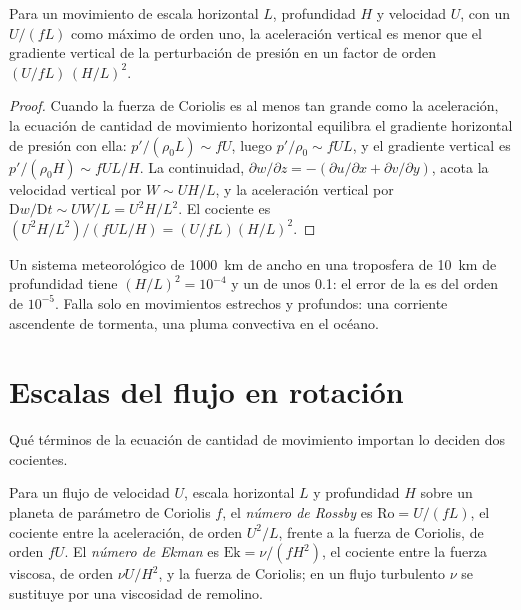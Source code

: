 \begin{proposition}\label{prop:b3:gfd-foundations:hydrostatic}
Para un movimiento de escala horizontal $L$, profundidad $H$ y velocidad $U$, con un
 $U/(fL)$ como máximo de orden uno, la aceleración vertical es
menor que el gradiente vertical de la perturbación de presión en un factor
de orden $(U/fL)\,(H/L)^2$.
\end{proposition}

\begin{proof}
Cuando la fuerza de Coriolis es al menos tan grande como la aceleración, la
ecuación de cantidad de movimiento horizontal equilibra el gradiente horizontal de presión
con ella: $p'/(\rho_0 L) \sim fU$, luego $p'/\rho_0 \sim fUL$, y el
gradiente vertical es $p'/(\rho_0 H) \sim fUL/H$. La continuidad, $\partial w/\partial z
= -(\partial u/\partial x + \partial v/\partial y)$, acota la velocidad vertical
por $W \sim UH/L$, y la aceleración vertical por
$\mathrm Dw/\mathrm Dt \sim UW/L = U^2H/L^2$. El cociente es $(U^2H/L^2)/(fUL/H)
= (U/fL)(H/L)^2$.
\end{proof}

Un sistema meteorológico de \qty{1000}{km} de ancho en una troposfera de \qty{10}{km} de profundidad tiene
$(H/L)^2 = 10^{-4}$ y un  de unos 0.1: el error de la
 es del orden de $10^{-5}$. Falla solo en movimientos estrechos y profundos: una
corriente ascendente de tormenta, una pluma convectiva en el océano.

\section{Escalas del flujo en rotación}\label{sec:b3:gfd-foundations:scales}

Qué términos de la ecuación de cantidad de movimiento importan lo deciden dos cocientes.

\begin{definition}\label{def:b3:gfd-foundations:numbers}
Para un flujo de velocidad $U$, escala horizontal $L$ y profundidad $H$ sobre un planeta de
parámetro de Coriolis $f$, el \emph{número de Rossby} es
$\mathrm{Ro} = U/(fL)$, el cociente entre la aceleración, de orden $U^2/L$,
frente a la fuerza de Coriolis, de orden $fU$. El \emph{número de
Ekman} es $\mathrm{Ek} = \nu/(fH^2)$, el cociente entre
la fuerza viscosa, de orden $\nu U/H^2$, y la fuerza de Coriolis; en un
flujo turbulento $\nu$ se sustituye por una viscosidad de remolino.
\end{definition}


